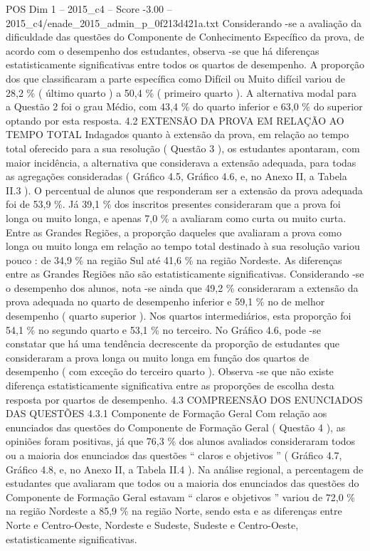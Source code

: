 \begin{textsample}{POS Dim 1 – 2015\_c4 – Score -3.00 – 2015\_c4/enade\_2015\_admin\_p\_0f213d421a.txt}
Considerando -se a avaliação da dificuldade das questões do Componente de Conhecimento Específico da prova, de acordo com o desempenho dos estudantes, observa -se que há diferenças estatisticamente significativas entre todos os quartos de desempenho.
A proporção dos que classificaram a parte específica como Difícil ou Muito difícil variou de 28,2 \% ( último quarto ) a 50,4 \% ( primeiro quarto ).
A alternativa modal para a Questão 2 foi o grau Médio, com 43,4 \% do quarto inferior e 63,0 \% do superior optando por esta resposta. 4.2 EXTENSÃO DA PROVA EM RELAÇÃO AO TEMPO TOTAL Indagados quanto à extensão da prova, em relação ao tempo total oferecido para a sua resolução ( Questão 3 ), os estudantes apontaram, com maior incidência, a alternativa que considerava a extensão adequada, para todas as agregações consideradas ( Gráfico 4.5, Gráfico 4.6, e, no Anexo II, a Tabela II.3 ).
O percentual de alunos que responderam ser a extensão da prova adequada foi de 53,9 \%.
Já 39,1 \% dos inscritos presentes consideraram que a prova foi longa ou muito longa, e apenas 7,0 \% a avaliaram como curta ou muito curta.
Entre as Grandes Regiões, a proporção daqueles que avaliaram a prova como longa ou muito longa em relação ao tempo total destinado à sua resolução variou pouco : de 34,9 \% na região Sul até 41,6 \% na região Nordeste.
As diferenças entre as Grandes Regiões não são estatisticamente significativas.
Considerando -se o desempenho dos alunos, nota -se ainda que 49,2 \% consideraram a extensão da prova adequada no quarto de desempenho inferior e 59,1 \% no de melhor desempenho ( quarto superior ).
Nos quartos intermediários, esta proporção foi 54,1 \% no segundo quarto e 53,1 \% no terceiro.
No Gráfico 4.6, pode -se constatar que há uma tendência decrescente da proporção de estudantes que consideraram a prova longa ou muito longa em função dos quartos de desempenho ( com exceção do terceiro quarto ).
Observa -se que não existe diferença estatisticamente significativa entre as proporções de escolha desta resposta por quartos de desempenho. 4.3 COMPREENSÃO DOS ENUNCIADOS DAS QUESTÕES 4.3.1 Componente de Formação Geral Com relação aos enunciados das questões do Componente de Formação Geral ( Questão 4 ), as opiniões foram positivas, já que 76,3 \% dos alunos avaliados consideraram todos ou a maioria dos enunciados das questões “ claros e objetivos ” ( Gráfico 4.7, Gráfico 4.8, e, no Anexo II, a Tabela II.4 ).
Na análise regional, a percentagem de estudantes que avaliaram que todos ou a maioria dos enunciados das questões do Componente de Formação Geral estavam “ claros e objetivos ” variou de 72,0 \% na região Nordeste a 85,9 \% na região Norte, sendo esta e as diferenças entre Norte e Centro-Oeste, Nordeste e Sudeste, Sudeste e Centro-Oeste, estatisticamente significativas.

\end{textsample}
